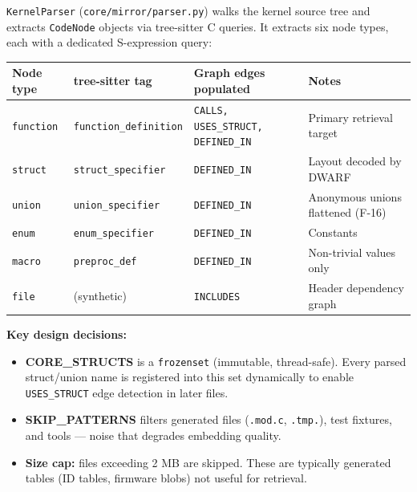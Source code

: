 \documentclass[11pt,a4paper]{article}
\newcommand{\coderef}[1]{\texttt{\small\color{layer2}#1}}
\begin{document}
\coderef{KernelParser} (\texttt{core/mirror/parser.py}) walks the kernel
source tree and extracts \coderef{CodeNode} objects via tree-sitter C queries.
It extracts six node types, each with a dedicated S-expression query:

\begin{center}
\begin{tabular}{@{}llll@{}}
\toprule
\textbf{Node type} & \textbf{tree-sitter tag} & \textbf{Graph edges populated} & \textbf{Notes} \\
\midrule
\texttt{function} & \texttt{function\_definition} & \texttt{CALLS, USES\_STRUCT, DEFINED\_IN} & Primary retrieval target \\
\texttt{struct}   & \texttt{struct\_specifier}    & \texttt{DEFINED\_IN}                      & Layout decoded by DWARF \\
\texttt{union}    & \texttt{union\_specifier}     & \texttt{DEFINED\_IN}                      & Anonymous unions flattened (F-16) \\
\texttt{enum}     & \texttt{enum\_specifier}      & \texttt{DEFINED\_IN}                      & Constants \\
\texttt{macro}    & \texttt{preproc\_def}         & \texttt{DEFINED\_IN}                      & Non-trivial values only \\
\texttt{file}     & (synthetic)                   & \texttt{INCLUDES}                         & Header dependency graph \\
\bottomrule
\end{tabular}
\end{center}

\noindent
\textbf{Key design decisions:}
\begin{itemize}[itemsep=2pt]
  \item \textbf{CORE\_STRUCTS} is a \texttt{frozenset} (immutable, thread-safe).
        Every parsed struct/union name is registered into this set dynamically
        to enable \texttt{USES\_STRUCT} edge detection in later files.
  \item \textbf{SKIP\_PATTERNS} filters generated files (\texttt{.mod.c},
        \texttt{.tmp.}), test fixtures, and tools --- noise that degrades embedding
        quality.
  \item \textbf{Size cap:} files exceeding 2 MB are skipped. These are typically
        generated tables (ID tables, firmware blobs) not useful for retrieval.
\end{itemize}

\end{document}
